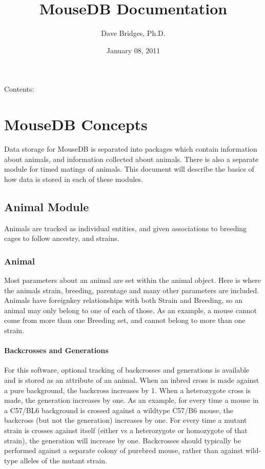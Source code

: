 \documentclass[letterpaper,10pt,english]{sphinxmanual}
\title{MouseDB Documentation}
\date{January 08, 2011}
\author{Dave Bridges, Ph.D.}
\begin{document}
\maketitle
\tableofcontents
{}\label{index::doc}


Contents:



\chapter{MouseDB Concepts}
\label{concepts:welcome-to-mousedb-s-documentation}\label{concepts::doc}\label{concepts:mousedb-concepts}
Data storage for MouseDB is separated into packages which contain information about animals, and information collected about animals.  There is also a separate module for timed matings of animals.  This document will describe the basics of how data is stored in each of these modules.



\section{Animal Module}
\label{concepts:animal-module}
Animals are tracked as individual entities, and given associations to breeding cages to follow ancestry, and strains.



\subsection{Animal}
\label{concepts:animal}
Most parameters about an animal are set within the animal object.  Here is where the animals strain, breeding, parentage and many other parameters are included.  Animals have foreignkey relationships with both Strain and Breeding, so an animal may only belong to one of each of those.  As an example, a mouse cannot come from more than one Breeding set, and cannot belong to more than one strain.



\subsubsection{Backcrosses and Generations}
\label{concepts:backcrosses-and-generations}
For this software, optional tracking of backcrosses and generations is available and is stored as an attribute of an animal.  When an inbred cross is made against a pure background, the backcross increases by 1.  When a heterozygote cross is made, the generation increases by one.  As an example, for every time a mouse in a C57/BL6 background is crossed against a wildtype C57/B6 mouse, the backcross (but not the generation) increases by one.  For every time a mutant strain is crosses against itself (either vs a heterozygote or homozygote of that strain), the generation will increase by one.  Backcrosses should typically be performed against a separate colony of purebred mouse, rather than against wild-type alleles of the mutant strain.
\end{document}
